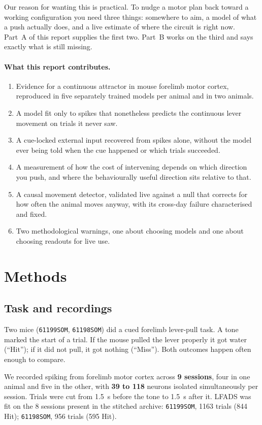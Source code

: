 \documentclass[11pt]{article}
\begin{document}
Our reason for wanting this is practical. To nudge a motor plan back toward a
working configuration you need three things: somewhere to aim, a model of what a
push actually does, and a live estimate of where the circuit is right now. Part~A
of this report supplies the first two. Part~B works on the third and says exactly
what is still missing.

\paragraph{What this report contributes.}
\begin{enumerate}
\item Evidence for a continuous attractor in mouse forelimb motor cortex,
reproduced in five separately trained models per animal and in two animals.
\item A model fit only to spikes that nonetheless predicts the continuous lever
movement on trials it never saw.
\item A cue-locked external input recovered from spikes alone, without the model
ever being told when the cue happened or which trials succeeded.
\item A measurement of how the cost of intervening depends on which direction you
push, and where the behaviourally useful direction sits relative to that.
\item A causal movement detector, validated live against a null that corrects for
how often the animal moves anyway, with its cross-day failure characterised and
fixed.
\item Two methodological warnings, one about choosing models and one about
choosing readouts for live use.
\end{enumerate}

\section{Methods}

\subsection{Task and recordings}

Two mice (\texttt{61199SOM}, \texttt{61198SOM}) did a cued forelimb lever-pull
task. A tone marked the start of a trial. If the mouse pulled the lever properly
it got water (``Hit''); if it did not pull, it got nothing (``Miss''). Both
outcomes happen often enough to compare.

We recorded spiking from forelimb motor cortex across \textbf{9 sessions}, four
in one animal and five in the other, with \textbf{39 to 118} neurons isolated
simultaneously per session. Trials were cut from 1.5~s before the tone to 1.5~s
after it. LFADS was fit on the 8 sessions present in the stitched archive:
\texttt{61199SOM}, 1163 trials (844 Hit); \texttt{61198SOM}, 956 trials (595
Hit).
\end{document}
